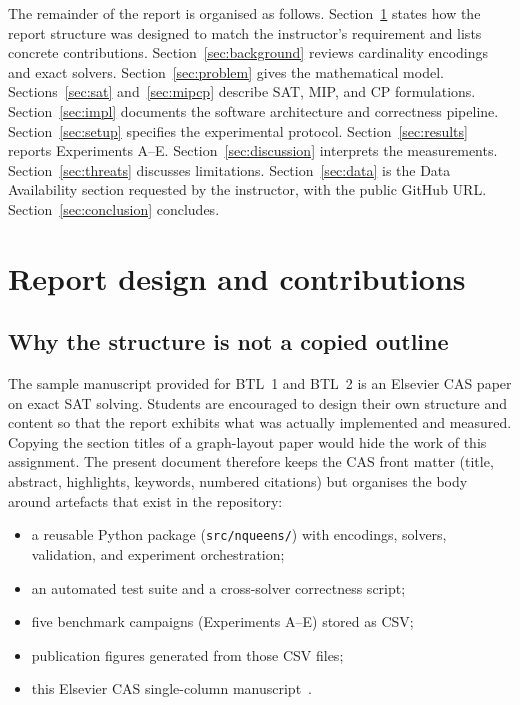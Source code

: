 \documentclass[a4paper,fleqn]{cas-sc}
\begin{document}
The remainder of the report is organised as follows.
Section~\ref{sec:design} states how the report structure was designed to match the instructor's requirement and lists concrete contributions.
Section~\ref{sec:background} reviews cardinality encodings and exact solvers.
Section~\ref{sec:problem} gives the mathematical model.
Sections~\ref{sec:sat} and~\ref{sec:mipcp} describe SAT, MIP, and CP formulations.
Section~\ref{sec:impl} documents the software architecture and correctness pipeline.
Section~\ref{sec:setup} specifies the experimental protocol.
Section~\ref{sec:results} reports Experiments A--E.
Section~\ref{sec:discussion} interprets the measurements.
Section~\ref{sec:threats} discusses limitations.
Section~\ref{sec:data} is the Data Availability section requested by the instructor, with the public GitHub URL.
Section~\ref{sec:conclusion} concludes.

\section{Report design and contributions}
\label{sec:design}

\subsection{Why the structure is not a copied outline}
The sample manuscript provided for BTL~1 and BTL~2 is an Elsevier CAS paper on exact SAT solving.
Students are encouraged to design their own structure and content so that the report exhibits what was actually implemented and measured.
Copying the section titles of a graph-layout paper would hide the work of this assignment.
The present document therefore keeps the CAS front matter (title, abstract, highlights, keywords, numbered citations) but organises the body around artefacts that exist in the repository:
\begin{itemize}
    \item a reusable Python package (\texttt{src/nqueens/}) with encodings, solvers, validation, and experiment orchestration;
    \item an automated test suite and a cross-solver correctness script;
    \item five benchmark campaigns (Experiments A--E) stored as CSV;
    \item publication figures generated from those CSV files;
    \item this Elsevier CAS single-column manuscript~\cite{casbundle}.
\end{itemize}
\end{document}
